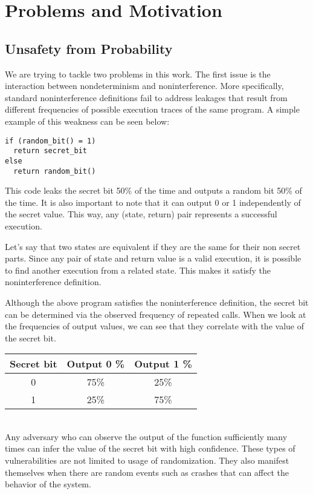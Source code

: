 
\section{Problems and Motivation}
\subsection{Unsafety from Probability}
We are trying to tackle two problems in this work. The first issue is the interaction between nondeterminism and noninterference. More specifically, standard noninterference definitions fail to address leakages that result from different frequencies of possible execution traces of the same program. A simple example of this weakness can be seen below: 

\begin{lstlisting}
if (random_bit() = 1)
  return secret_bit
else
  return random_bit()
\end{lstlisting}

This code leaks the secret bit 50\% of the time and outputs a random bit 50\% of the time. It is also important to note that it can output 0 or 1 independently of the secret value. This way, any (state, return) pair represents a successful execution. 

Let’s say that two states are equivalent if they are the same for their non secret parts. Since any pair of state and return value is a valid execution, it is possible to find another execution from a related state. This makes it satisfy the noninterference definition. 

Although the above program satisfies the noninterference definition, the secret bit can be determined via the observed frequency of repeated calls. When we look at the frequencies of output values, we can see that they correlate with the value of the secret bit. \\

\begin{tabular}{| c | c | c |}
	\hline
	Secret bit & Output 0 \% & Output 1 \% \\
	\hline
	0 &	75\% & 25\% \\
	\hline
	1 &	25\% & 75\% \\
	\hline
\end{tabular}\\

Any adversary who can observe the output of the function sufficiently many times can infer the value of the secret bit with high confidence. These types of vulnerabilities are not limited to usage of randomization. They also manifest themselves when there are random events such as crashes that can affect the behavior of the system.
 
